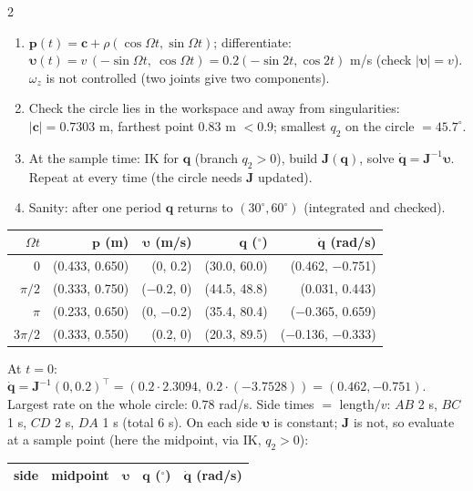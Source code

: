 \begin{multicols}{2}
\begin{recipe}[circle]
\begin{enumerate}
\item $\mathbf p(t)=\mathbf c+\rho(\cos\Omega t,\sin\Omega t)$; differentiate: $\boldsymbol\upsilon(t)=v\,(-\sin\Omega t,\ \cos\Omega t)=0.2(-\sin2t,\cos2t)$ m/s (check $|\boldsymbol\upsilon|=v$). $\omega_z$ is not controlled (two joints give two components).
\item Check the circle lies in the workspace and away from singularities: $|\mathbf c|=0.7303$ m, farthest point $0.83$ m $<0.9$; smallest $q_2$ on the circle $=45.7^\circ$.
\item At the sample time: IK for $\mathbf q$ (branch $q_2>0$), build $\mathbf J(\mathbf q)$, solve $\dot{\mathbf q}=\mathbf J^{-1}\boldsymbol\upsilon$. Repeat at every time (the circle needs $\mathbf J$ updated).
\item Sanity: after one period $\mathbf q$ returns to $(30^\circ,60^\circ)$ (integrated and checked).
\end{enumerate}
\end{recipe}
\begin{center}\small
\begin{tabular}{@{}rrrrr@{}}\toprule $\Omega t$&$\mathbf p$ (m)&$\boldsymbol\upsilon$ (m/s)&$\mathbf q$ ($^\circ$)&$\dot{\mathbf q}$ (rad/s)\\\midrule
0&(0.433, 0.650)&(0, 0.2)&(30.0, 60.0)&(0.462, $-$0.751)\\
$\pi/2$&(0.333, 0.750)&($-$0.2, 0)&(44.5, 48.8)&(0.031, 0.443)\\
$\pi$&(0.233, 0.650)&(0, $-$0.2)&(35.4, 80.4)&($-$0.365, 0.659)\\
$3\pi/2$&(0.333, 0.550)&(0.2, 0)&(20.3, 89.5)&($-$0.136, $-$0.333)\\\bottomrule\end{tabular}
\end{center}
At $t=0$: $\dot{\mathbf q}=\mathbf J^{-1}(0,0.2)^\top=(0.2\cdot2.3094,\ 0.2\cdot(-3.7528))=(0.462,-0.751)$. Largest rate on the whole circle: $0.78$ rad/s. \chk
\columnbreak
{}
Side times $=$ length$/v$: $AB$ 2 s, $BC$ 1 s, $CD$ 2 s, $DA$ 1 s (total 6 s). On each side $\boldsymbol\upsilon$ is constant; $\mathbf J$ is not, so evaluate at a sample point (here the midpoint, via IK, $q_2>0$):
\begin{center}\small
\begin{tabular}{@{}llrrr@{}}\toprule side&midpoint&$\boldsymbol\upsilon$&$\mathbf q$ ($^\circ$)&$\dot{\mathbf q}$ (rad/s)\\\midrule

\end{tabular}
\end{center}
\end{multicols}
